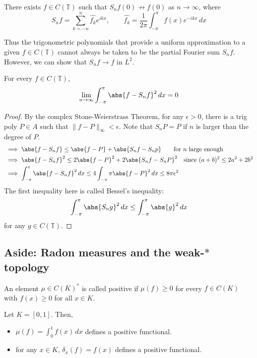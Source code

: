 \documentclass{article}
\begin{document}
\begin{eg}
    There exists $f \in C(\mathbb{T})$ such that $S_nf(0) \not\to f(0)$ as $n \to \infty$, where
    \begin{equation*}
        S_nf = \sum_{k = -n}^{n} \hat{f_k} e^{i k x}, \qquad \hat{f_k} = \frac{1}{2\pi} \int_{-\pi}^{\pi} f(x) e^{-i k x} \, dx
    \end{equation*}
\end{eg}

Thus the trigonometric polynomials that provide a uniform approximation to a given $f \in C(\mathbb{T})$ cannot always be taken to be the partial Fourier sum $S_nf$.
However, we can show that $S_nf \to f$ in $L^2$.
\begin{prop}
    For every $f \in C(\mathbb{T})$,
    \begin{equation*}
        \lim_{n \to \infty} \int_{-\pi}^\pi \abs{f - S_nf}^2 \, dx = 0
    \end{equation*}
\end{prop}
\begin{proof}
    By the complex Stone-Weierstrass Theorem, for any $\epsilon > 0$, there is a trig poly $P \in A$ such that $\|f-P\|_\infty < \epsilon$.
    Note that $S_n P = P$ if $n$ is larger than the degree of $P$.
    \begin{align*}
        &\implies \abs{f - S_n f} \leq \abs{f - P} + \abs{S_n f - S_n p} \qquad \text{for $n$ large enough}\\
        &\implies \abs{f - S_n f}^2 \leq 2\abs{f - P}^2 + 2 \abs{S_n f - S_n P}^2 \quad \text{since } (a+b)^2 \leq 2a^2 + 2b^2 \\
        &\implies \int_{-\pi}^{\pi} \abs{f - S_n f}^2 \, dx \leq 4 \int_{-\pi}{\pi} \abs{f - P}^2 \, dx \leq 8 \pi \epsilon^2
    \end{align*}
    The first inequality here is called Bessel's inequality:
    \begin{equation*}
        \int_{-\pi}^\pi \abs{S_n g}^2 \, dx \leq \int_{-\pi}^\pi \abs{g}^2 \, dx
    \end{equation*}
    for any $g \in C(\mathbb{T})$.
\end{proof}

\subsection{Aside: Radon measures and the weak-$*$ topology}
\begin{defi}
    An element $\mu \in C(K)^*$ is called positive if $\mu(f) \geq 0$ for every $f \in C(K)$ with $f(x) \geq 0$ for all $x \in K$.
\end{defi}
\begin{eg}
    Let $K = [0, 1]$. Then,
    \begin{itemize}
        \item $\mu(f) = \int_0^1 f(x) \, dx$ defines a positive functional.
        \item for any $x \in K$, $\delta_x(f) = f(x)$ defines a positive functional.
    \end{itemize}
\end{eg}
\end{document}
